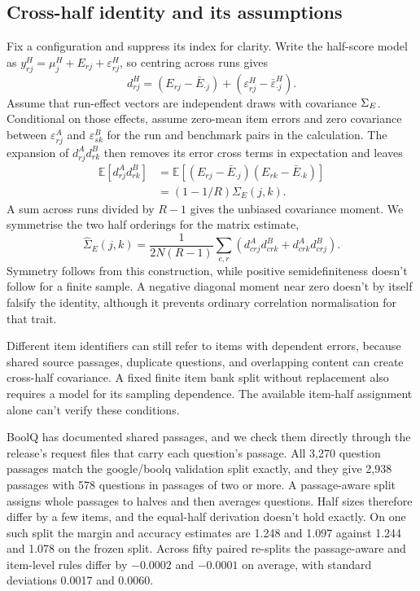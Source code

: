 \subsection{Cross-half identity and its assumptions}
Fix a configuration and suppress its index for clarity. Write the half-score model as $y^H_{rj}=\mu^H_j+E_{rj}+\varepsilon^H_{rj}$, so centring across runs gives
\begin{equation}
d^H_{rj}=(E_{rj}-\bar E_{\cdot j})+(\varepsilon^H_{rj}-\bar\varepsilon^H_{\cdot j}).
\end{equation}
Assume that run-effect vectors are independent draws with covariance $\Sigma_E$. Conditional on those effects, assume zero-mean item errors and zero covariance between $\varepsilon^A_{rj}$ and $\varepsilon^B_{sk}$ for the run and benchmark pairs in the calculation. The expansion of $d^A_{rj}d^B_{rk}$ then removes its error cross terms in expectation and leaves
\begin{align}
\mathbb E[d^A_{rj}d^B_{rk}]
&=\mathbb E[(E_{rj}-\bar E_{\cdot j})(E_{rk}-\bar E_{\cdot k})]\\
&=(1-1/R)\Sigma_E(j,k).
\end{align}
A sum across runs divided by $R-1$ gives the unbiased covariance moment. We symmetrise the two half orderings for the matrix estimate,
\begin{equation}
\widehat\Sigma_E(j,k)=\frac{1}{2N(R-1)}\sum_{c,r}
\left(d^A_{crj}d^B_{crk}+d^A_{crk}d^B_{crj}\right).
\end{equation}
Symmetry follows from this construction, while positive semidefiniteness doesn't follow for a finite sample. A negative diagonal moment near zero doesn't by itself falsify the identity, although it prevents ordinary correlation normalisation for that trait.

Different item identifiers can still refer to items with dependent errors, because shared source passages, duplicate questions, and overlapping content can create cross-half covariance. A fixed finite item bank split without replacement also requires a model for its sampling dependence. The available item-half assignment alone can't verify these conditions.

BoolQ has documented shared passages, and we check them directly through the release's request files that carry each question's passage. All 3,270 question passages match the google/boolq validation split exactly, and they give 2,938 passages with 578 questions in passages of two or more. A passage-aware split assigns whole passages to halves and then averages questions. Half sizes therefore differ by a few items, and the equal-half derivation doesn't hold exactly. On one such split the margin and accuracy estimates are 1.248 and 1.097 against 1.244 and 1.078 on the frozen split. Across fifty paired re-splits the passage-aware and item-level rules differ by $-0.0002$ and $-0.0001$ on average, with standard deviations 0.0017 and 0.0060.

